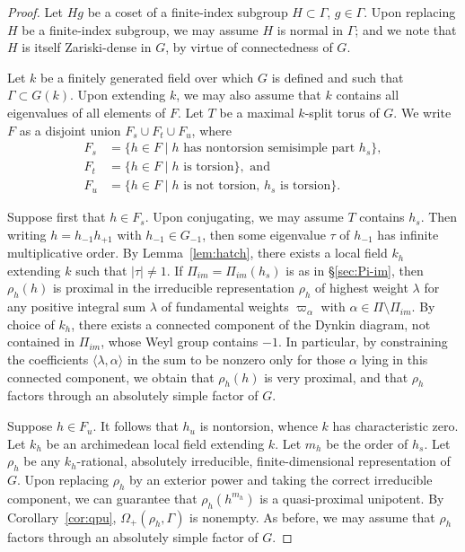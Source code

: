 \documentclass{amsart}
\theoremstyle{plain}
\theoremstyle{definition}
\theoremstyle{remark}
\providecommand{\abs}[1]{\lvert#1\rvert}
\begin{document}
\begin{proof}
Let $Hg$ be a coset of a finite-index subgroup $H \subset \Gamma$, $g\in \Gamma$. Upon
replacing $H$ be a finite-index subgroup, we may assume $H$ is normal in $\Gamma$; and we
note that $H$ is itself Zariski-dense in $G$, by virtue of connectedness of $G$.

Let $k$ be a finitely generated field over which $G$ is defined and such that $\Gamma
\subset G(k)$. Upon extending $k$, we may also assume that $k$ contains all eigenvalues
of all elements of $F$. Let $T$ be a maximal $k$-split torus of $G$. We write $F$ as a
disjoint union $F_{s} \cup F_{t} \cup F_{u}$, where
\begin{align*}
F_{s} &= \{h \in F \mid h\text{ has nontorsion semisimple part $h_{s}$}\},\\
F_{t} &= \{h \in F \mid h\text{ is torsion}\},\text{ and}\\
F_{u} &= \{h \in F \mid \text{$h$ is not torsion, $h_{s}$ is torsion}\}.
\end{align*}

Suppose first that $h \in F_{s}$. Upon conjugating, we may assume $T$
contains $h_{s}$. Then writing $h = h_{-1}h_{+1}$ with $h_{-1} \in G_{-1}$, then some
eigenvalue $\tau$ of $h_{-1}$ has infinite multiplicative order. By Lemma~\ref{lem:hatch},
there exists a local field $k_{h}$
extending $k$ such that $\abs{\tau} \neq 1$. If $\Pi_{im} =
\Pi_{im}(h_{s})$ is as in \S\ref{sec:Pi-im}, then $\rho_{h}(h)$ is proximal in the irreducible
representation $\rho_{h}$ of highest weight $\lambda$ for any positive integral sum
$\lambda$ of fundamental weights $\varpi_{\alpha}$ with $\alpha \in \Pi
\setminus \Pi_{im}$. By choice of $k_{h}$, there exists a connected component of the Dynkin
diagram, not contained in $\Pi_{im}$, whose Weyl group contains $-1$. In particular, by
constraining the coefficients
$\langle \lambda, \alpha \rangle$ in the sum to be nonzero only for those $\alpha$ lying in
this
connected component, we obtain that $\rho_{h}(h)$ is very proximal, and that $\rho_{h}$
factors through an absolutely simple factor of $G$.

Suppose $h \in F_{u}$. It follows that $h_{u}$ is nontorsion, whence $k$ has
characteristic zero. Let
$k_{h}$ be an archimedean local field extending $k$. Let $m_{h}$ be the order of $h_{s}$.
Let $\rho_{h}$ be any
 $k_{h}$-rational, absolutely irreducible, finite-dimensional representation of $G$.
Upon replacing $\rho_{h}$ by an exterior power and taking the correct irreducible
component, we can guarantee that $\rho_{h}(h^{m_{h}})$ is a quasi-proximal unipotent.
By Corollary~\ref{cor:qpu}, $\Omega_{+}(\rho_{h}, \Gamma)$ is nonempty. As before, we
may assume that $\rho_{h}$ factors
through an absolutely simple factor of $G$.


\end{proof}
\end{document}
